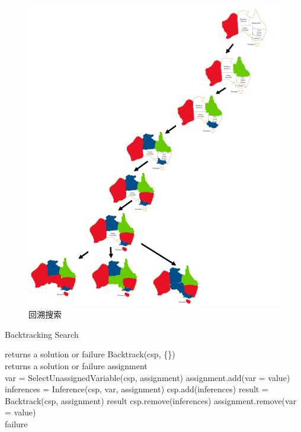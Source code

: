 \begin{figure}[H]
    \centering
    \includegraphics[scale=0.8]{img/C2/2-3/1.png}
    \caption{回溯搜索}
\end{figure}

\begin{algorithm}[H]
    \caption{Backtracking Search}
    \begin{algorithmic}[1]
         returns a solution or failure
        \State \Return Backtrack(csp, \{\})
        \EndProcedure
        \\
         returns a solution or failure
        \State \Return assignment
        \EndIf
        \\
        \State var = SelectUnassignedVariable(csp, assignment)
        \State assignment.add({var = value})
        \State inferences = Inference(csp, var, assignment)
        \State csp.add(inferences)
        \State result = Backtrack(csp, assignment)
        \State \Return result
        \EndIf
        \State csp.remove(inferences)
        \EndIf
        \State assignment.remove({var = value})
        \EndIf
        \EndFor
        \\
        \State \Return failure
        \EndProcedure
    \end{algorithmic}
\end{algorithm}

